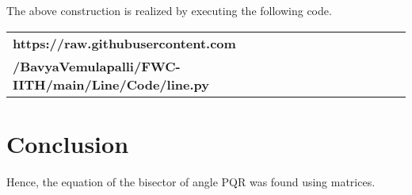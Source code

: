 \documentclass[journal,10pt,twocolumn]{article}
\begin{document}
    The above construction is realized by executing the following code.
    
\begin{table}[H]
\begin{tabular}{|l|c|c|c|c|c|c|c|c}\hline\textbf{https://raw.githubusercontent.com}\\
    \textbf{/BavyaVemulapalli/FWC-IITH/main/Line/Code/line.py} \\ \hline
\end{tabular}
\end{table}

\section{Conclusion}

    Hence, the equation of the bisector of angle PQR was found using matrices.
\end{document}
